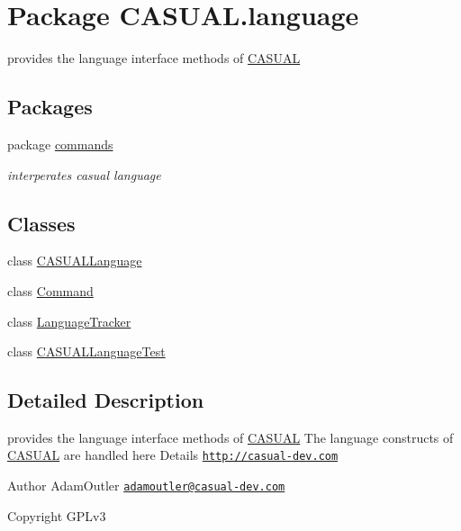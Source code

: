\hypertarget{namespace_c_a_s_u_a_l_1_1language}{\section{Package C\-A\-S\-U\-A\-L.\-language}
\label{namespace_c_a_s_u_a_l_1_1language}
}


provides the language interface methods of \hyperlink{namespace_c_a_s_u_a_l}{C\-A\-S\-U\-A\-L}  


\subsection*{Packages}
\begin{DoxyCompactItemize}
\item 
package \hyperlink{namespace_c_a_s_u_a_l_1_1language_1_1commands}{commands}
\begin{DoxyCompactList}\small\item\em interperates casual language \end{DoxyCompactList}\end{DoxyCompactItemize}
\subsection*{Classes}
\begin{DoxyCompactItemize}
\item 
class \hyperlink{class_c_a_s_u_a_l_1_1language_1_1_c_a_s_u_a_l_language}{C\-A\-S\-U\-A\-L\-Language}
\item 
class \hyperlink{class_c_a_s_u_a_l_1_1language_1_1_command}{Command}
\item 
class \hyperlink{class_c_a_s_u_a_l_1_1language_1_1_language_tracker}{Language\-Tracker}
\item 
class \hyperlink{class_c_a_s_u_a_l_1_1language_1_1_c_a_s_u_a_l_language_test}{C\-A\-S\-U\-A\-L\-Language\-Test}
\end{DoxyCompactItemize}


\subsection{Detailed Description}
provides the language interface methods of \hyperlink{namespace_c_a_s_u_a_l}{C\-A\-S\-U\-A\-L} The language constructs of \hyperlink{namespace_c_a_s_u_a_l}{C\-A\-S\-U\-A\-L} are handled here Details \href{http://casual-dev.com}{\tt http\-://casual-\/dev.\-com} \begin{DoxyAuthor}{Author}
Adam\-Outler \href{mailto:adamoutler@casual-dev.com}{\tt adamoutler@casual-\/dev.\-com} 
\end{DoxyAuthor}
\begin{DoxyCopyright}{Copyright}
G\-P\-Lv3 
\end{DoxyCopyright}
